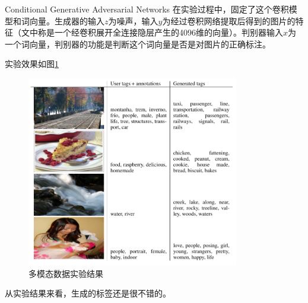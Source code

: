 \documentclass{ctexart}
\begin{document}
\begin{section}{Conditional Generative Adversarial Networks\cite{mirza2014conditional}}
		在实验过程中，固定了这个卷积模型和词向量。生成器的输入$z$为噪声，输入$y$为经过卷积网络提取后得到的图片的特征（文中称是一个经卷积展开全连接隐层产生的4096维的向量）。判别器输入$x$为一个词向量，判别器的功能是判断这个词向量是否是对图片的正确标注。
		
		实验效果如图\ref{fig:cgan-exp-mul-mod}
		
		\begin{figure}
			\centering
			\includegraphics[width=25em]{figures/CGAN-experiment-multi-modal.png}
			\caption{多模态数据实验结果}
			\label{fig:cgan-exp-mul-mod}
		\end{figure}
		
		从实验结果来看，生成的标签还是很不错的。
		
	\end{section}
\end{document}
